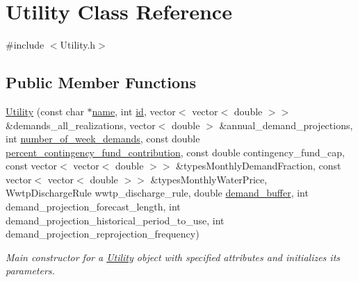 \hypertarget{classUtility}{}\section{Utility Class Reference}
\label{classUtility}


{\ttfamily \#include $<$Utility.\+h$>$}

\subsection*{Public Member Functions}
\begin{DoxyCompactItemize}
\item 
\mbox{\hyperlink{classUtility_a53fb19e5a344de5892c5cfbcc1225da9}{Utility}} (const char $\ast$\mbox{\hyperlink{classUtility_ad0ce5c179a7f5ceb46d4fcae08dbfb47}{name}}, int \mbox{\hyperlink{classUtility_ad41c4ea5c911c5000452a3371cd65d5f}{id}}, vector$<$ vector$<$ double $>$$>$ \&demands\+\_\+all\+\_\+realizations, vector$<$ double $>$ \&annual\+\_\+demand\+\_\+projections, int \mbox{\hyperlink{classUtility_a0548db3746582251082aa430db49dad0}{number\+\_\+of\+\_\+week\+\_\+demands}}, const double \mbox{\hyperlink{classUtility_a7b1a097ec188be8e7175d058b5e6596c}{percent\+\_\+contingency\+\_\+fund\+\_\+contribution}}, const double contingency\+\_\+fund\+\_\+cap, const vector$<$ vector$<$ double $>$$>$ \&types\+Monthly\+Demand\+Fraction, const vector$<$ vector$<$ double $>$$>$ \&types\+Monthly\+Water\+Price, Wwtp\+Discharge\+Rule wwtp\+\_\+discharge\+\_\+rule, double \mbox{\hyperlink{classUtility_a4be9760339ec06e5c932890da8e566b3}{demand\+\_\+buffer}}, int demand\+\_\+projection\+\_\+forecast\+\_\+length, int demand\+\_\+projection\+\_\+historical\+\_\+period\+\_\+to\+\_\+use, int demand\+\_\+projection\+\_\+reprojection\+\_\+frequency)
\begin{DoxyCompactList}\small\item\em Main constructor for a \mbox{\hyperlink{classUtility}{Utility}} object with specified attributes and initializes its parameters. \end{DoxyCompactList}\item 
$$
\end{DoxyCompactItemize}
